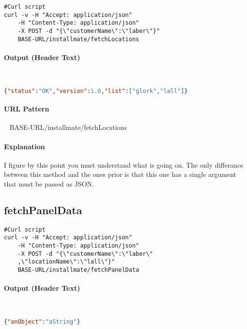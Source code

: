 \documentclass[
10pt, %
letterpaper, %
oneside, %
headinclude,footinclude, %
BCOR5mm, %
]{scrartcl}
\begin{document}
\begin{lstlisting}
#Curl script
curl -v -H "Accept: application/json" 
	-H "Content-Type: application/json" 
	-X POST -d "{\"customerName\":\"laber\"}" 
	BASE-URL/installmate/fetchLocations
\end{lstlisting}

\paragraph{Output (Header Text)}~
\begin{lstlisting}[language=json]
{"status":"OK","version":1.0,"list":["glork","lall"]}
\end{lstlisting}

\paragraph{URL Pattern} 
~\newline
BASE-URL/installmate/fetchLocations

\paragraph{Explanation} I figure by this point you must understand what is going on. The only differance between this method and the ones prior is that this one has a single argument that must be passed as JSON.



\subsection{\textbf{fetchPanelData}}

\begin{lstlisting}
#Curl script
curl -v -H "Accept: application/json" 
	-H "Content-Type: application/json" 
	-X POST -d "{\"customerName\":\"laber\"
	,\"locationName\":\"lall\"}" 
	BASE-URL/installmate/fetchPanelData
\end{lstlisting}

\paragraph{Output (Header Text)}~
\begin{lstlisting}[language=json]
{"anObject":"aString"}
\end{lstlisting}

\end{document}
